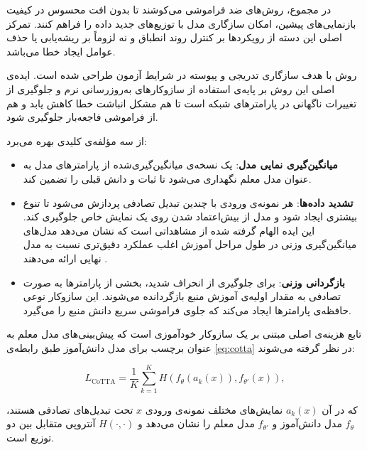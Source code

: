 در مجموع، روش‌های ضد فراموشی می‌کوشند تا بدون افت محسوس در کیفیت بازنمایی‌های پیشین، امکان سازگاری مدل با توزیع‌های جدید داده را فراهم کنند. تمرکز اصلی این دسته از رویکردها بر کنترل روند انطباق و نه لزوماً بر ریشه‌یابی یا حذف عوامل ایجاد خطا می‌باشد.


روش  با هدف سازگاری تدریجی و پیوسته در شرایط آزمون طراحی شده است. ایده‌ی اصلی این روش بر پایه‌ی استفاده از سازوکارهای به‌روزرسانی نرم و جلوگیری از تغییرات ناگهانی در پارامترهای شبکه است تا هم مشکل انباشت خطا کاهش یابد و هم از فراموشی فاجعه‌بار جلوگیری شود.  

 از سه مؤلفه‌ی کلیدی بهره می‌برد:  
\begin{itemize}
	\item \textbf{میانگین‌گیری نمایی مدل}: یک نسخه‌ی میانگین‌گیری‌شده از پارامترهای مدل به عنوان مدل معلم نگهداری می‌شود تا ثبات و دانش قبلی را تضمین کند.  
	\item \textbf{تشدید داده‌ها}: هر نمونه‌ی ورودی با چندین تبدیل تصادفی پردازش می‌شود تا تنوع بیشتری ایجاد شود و مدل از بیش‌اعتماد شدن روی یک نمایش خاص جلوگیری کند. این ایده الهام گرفته شده از مشاهداتی است که نشان می‌دهد مدل‌های میانگین‌گیری وزنی در طول مراحل آموزش اغلب عملکرد دقیق‌تری نسبت به مدل نهایی ارائه می‌دهند \cite{polyak1992, tarvainen2017}.
	
	\item \textbf{بازگردانی وزنی}: برای جلوگیری از انحراف شدید، بخشی از پارامترها به صورت تصادفی به مقدار اولیه‌ی آموزش منبع بازگردانده می‌شوند. این سازوکار نوعی حافظه‌ی پارامترها ایجاد می‌کند که جلوی فراموشی سریع دانش منبع را می‌گیرد.  
\end{itemize}

تابع هزینه‌ی اصلی  مبتنی بر یک سازوکار خودآموزی است که پیش‌بینی‌های مدل معلم به عنوان برچسب‌ برای مدل دانش‌آموز طبق رابطه‌ی \ref{eq:cotta} در نظر گرفته می‌شوند\cite{cotta}:  

\begin{equation}
	L_{\text{CoTTA}} = \frac{1}{K} \sum_{k=1}^{K} H(f_{\theta}(a_k(x)), f_{\theta'}(x)),
	\label{eq:cotta}
\end{equation}

که در آن \(a_k(x)\) نمایش‌های مختلف نمونه‌ی ورودی \(x\) تحت تبدیل‌های تصادفی هستند، \(f_{\theta}\) مدل دانش‌آموز و \(f_{\theta'}\) مدل معلم را نشان می‌دهد و \(H(\cdot, \cdot)\) آنتروپی متقابل بین دو توزیع است.  

